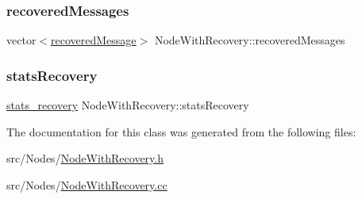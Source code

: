 \mbox{\label{class_node_with_recovery_adf6b319a727cd9ec43a6cc68cbf99bbb}} 
\subsubsection{\texorpdfstring{recovered\+Messages}{recoveredMessages}}
{\footnotesize\ttfamily vector$<$\hyperlink{_node_with_recovery_8h_abc64f7ff8d329883ae93979292b1c996}{recovered\+Message}$>$ Node\+With\+Recovery\+::recovered\+Messages\hspace{0.3cm}{\ttfamily [protected]}}

\mbox{\label{class_node_with_recovery_abaecd0d1b36ad0305c281905a3465dd6}} 
\subsubsection{\texorpdfstring{stats\+Recovery}{statsRecovery}}
{\footnotesize\ttfamily \hyperlink{_node_with_recovery_8h_a8724f9aa35500c4029d1757428ade746}{stats\+\_\+recovery} Node\+With\+Recovery\+::stats\+Recovery\hspace{0.3cm}{\ttfamily [protected]}}



The documentation for this class was generated from the following files\+:\begin{DoxyCompactItemize}
\item 
src/\+Nodes/\hyperlink{_node_with_recovery_8h}{Node\+With\+Recovery.\+h}\item 
src/\+Nodes/\hyperlink{_node_with_recovery_8cc}{Node\+With\+Recovery.\+cc}\end{DoxyCompactItemize}

